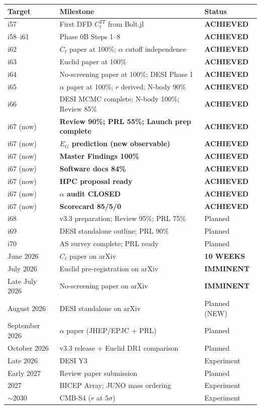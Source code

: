 \documentclass[11pt,a4paper]{article}
\begin{document}
\begin{center}
\begin{longtable}{lll}
\toprule
\textbf{Target} & \textbf{Milestone} & \textbf{Status} \\
\midrule
i57 & First DFD $C_\ell^{TT}$ from Bolt.jl & \textbf{ACHIEVED} \\
i58--i61 & Phase 0B Steps 1--8 & \textbf{ACHIEVED} \\
i62 & $C_\ell$ paper at 100\%; $\alpha$ cutoff independence & \textbf{ACHIEVED} \\
i63 & Euclid paper at 100\% & \textbf{ACHIEVED} \\
i64 & No-screening paper at 100\%; DESI Phase 1 & \textbf{ACHIEVED} \\
i65 & $\alpha$ paper at 100\%; $r$ derived; N-body 90\% & \textbf{ACHIEVED} \\
i66 & DESI MCMC complete; N-body 100\%; Review 85\% & \textbf{ACHIEVED} \\
i67 (now) & \textbf{Review 90\%; PRL 55\%; Launch prep complete} & \textbf{ACHIEVED} \\
i67 (now) & \textbf{$E_G$ prediction (new observable)} & \textbf{ACHIEVED} \\
i67 (now) & \textbf{Master Findings 100\%} & \textbf{ACHIEVED} \\
i67 (now) & \textbf{Software docs 84\%} & \textbf{ACHIEVED} \\
i67 (now) & \textbf{HPC proposal ready} & \textbf{ACHIEVED} \\
i67 (now) & \textbf{$\alpha$ audit CLOSED} & \textbf{ACHIEVED} \\
i67 (now) & \textbf{Scorecard 85/5/0} & \textbf{ACHIEVED} \\
\midrule
i68 & v3.3 preparation; Review 95\%; PRL 75\% & Planned \\
i69 & DESI standalone outline; PRL 90\% & Planned \\
i70 & AS survey complete; PRL ready & Planned \\
\midrule
June 2026 & $C_\ell$ paper on arXiv & \textbf{10 WEEKS} \\
July 2026 & Euclid pre-registration on arXiv & \textbf{IMMINENT} \\
Late July 2026 & No-screening paper on arXiv & \textbf{IMMINENT} \\
August 2026 & DESI standalone on arXiv & Planned (NEW) \\
September 2026 & $\alpha$ paper (JHEP/EPJC + PRL) & Planned \\
October 2026 & v3.3 release + Euclid DR1 comparison & Planned \\
Late 2026 & DESI Y3 & Experiment \\
Early 2027 & Review paper submission & Planned \\
2027 & BICEP Array; JUNO mass ordering & Experiment \\
$\sim$2030 & CMB-S4 ($r$ at $5\sigma$) & Experiment \\
\bottomrule
\end{longtable}
\end{center}
\end{document}

